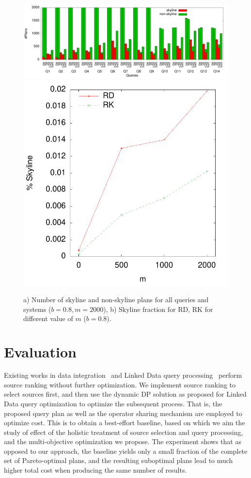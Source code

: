 \begin{figure}[htb]
  \vspace{-0.5cm}
  \centering
  \includegraphics[width=0.75\linewidth]{figs/all_queries.pdf}
  \includegraphics[width=0.24\linewidth]{figs/plans_skyline_by_m.pdf}
  \caption{a) Number of skyline and non-skyline plans for all queries
    and systems ($b=0.8, m=2000$), b) Skyline fraction for RD, RK for
    different value of $m$ ($b=0.8$).}
  \label{fig:queries}
  \vspace{-0.5cm}
\end{figure}

\section{Evaluation}
\label{sec:eva}
Existing works in data integration~\cite{levy_querying_1996} and Linked Data query processing~\cite{harth_data_2010,ladwig_linked_2010} perform source ranking
without further optimization. We implement source ranking to select sources first, and then use the dynamic DP solution as proposed for Linked Data query optimization to optimize
the subsequent process. That is, the proposed query plan as well as
the operator sharing mechanism are employed to optimize cost. This is
to obtain a best-effort baseline, based on which we aim the study of
effect of the holistic treatment of source selection and query
processing, and the multi-objective optimization we propose. The
experiment shows that as opposed to our approach, the baseline yields
only a small fraction of the complete set of Pareto-optimal plans, and
the resulting suboptimal plans lead to much higher total cost when producing
the same number of results. 


